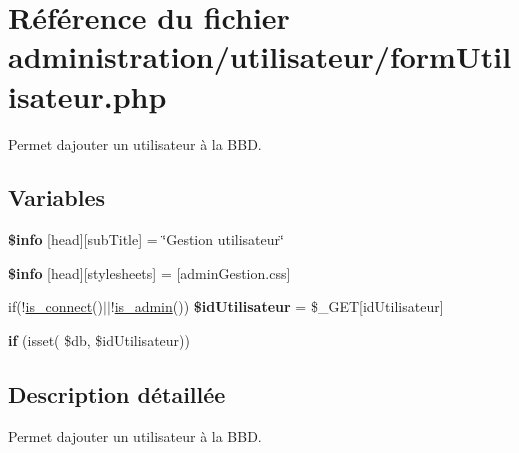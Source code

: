 \hypertarget{formUtilisateur_8php}{}\section{Référence du fichier administration/utilisateur/form\+Utilisateur.php}
\label{formUtilisateur_8php}


Permet d\textquotesingle{}ajouter un utilisateur à la B\+BD.  


\subsection*{Variables}
\begin{DoxyCompactItemize}
\item 
\mbox{\label{formUtilisateur_8php_a024f87f9bf4f3b33710e2e7ff8f60823}} 
{\bfseries \$info} \mbox{[}\textquotesingle{}head\textquotesingle{}\mbox{]}\mbox{[}\textquotesingle{}sub\+Title\textquotesingle{}\mbox{]} = \char`\"{}Gestion utilisateur\char`\"{}
\item 
\mbox{\label{formUtilisateur_8php_af6044c8bf78ebc8c58057e14d7738bbd}} 
{\bfseries \$info} \mbox{[}\textquotesingle{}head\textquotesingle{}\mbox{]}\mbox{[}\textquotesingle{}stylesheets\textquotesingle{}\mbox{]} = \mbox{[}\textquotesingle{}admin\+Gestion.\+css\textquotesingle{}\mbox{]}
\item 
\mbox{\label{formUtilisateur_8php_a42e2efa77cf6c065fdbea41c3c5046f1}} 
if(!\hyperlink{fonctionCompte_8php_a2fe594e0482307b8729ea37780d6f74b}{is\+\_\+connect}()$\vert$$\vert$!\hyperlink{fonctionCompte_8php_a0b327581800dba50ad70720e23ae2ed2}{is\+\_\+admin}()) {\bfseries \$id\+Utilisateur} = \$\+\_\+\+G\+ET\mbox{[}\textquotesingle{}id\+Utilisateur\textquotesingle{}\mbox{]}
\item 
\mbox{\label{formUtilisateur_8php_a1715e0d9ff94e0738a7c72bd43da9c67}} 
{\bfseries if} (isset( \$db, \$id\+Utilisateur))
\end{DoxyCompactItemize}


\subsection{Description détaillée}
Permet d\textquotesingle{}ajouter un utilisateur à la B\+BD. 

